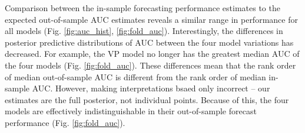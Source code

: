 \documentclass[12pt,letterpaper]{article}
\begin{document}
\begin{refsection}
Comparison between the in-sample forecasting performance estimates to the expected out-of-sample AUC estimates reveals a similar range in performance for all models (Fig. \ref{fig:auc_hist}, \ref{fig:fold_auc}). Interestingly, the differences in posterior predictive distributions of AUC between the four model variations has decreased. For example, the VP model no longer has the greatest median AUC of the four models (Fig. \ref{fig:fold_auc}). These differences mean that the rank order of median out-of-sample AUC is different from the rank order of median in-sample AUC. However, making interpretations bsaed only incorrect -- our estimates are the full posterior, not individual points. Because of this, the four models are effectively indistinguishable in their out-of-sample forecast performance (Fig. \ref{fig:fold_auc}).




\end{refsection}
\end{document}
